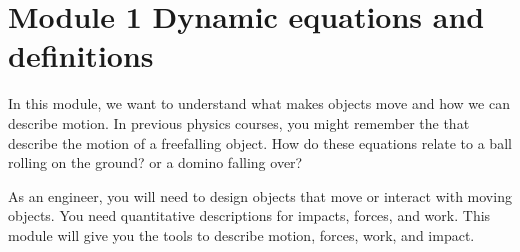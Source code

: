 \documentclass[letterpaper,10pt,english]{sphinxmanual}
\begin{document}
\chapter{Module 1 \sphinxhyphen{} Dynamic equations and definitions}
\label{\detokenize{module_01/overview:module-1-dynamic-equations-and-definitions}}\label{\detokenize{module_01/overview::doc}}

In this module, we want to understand what makes objects move and how we
can describe motion. In previous physics courses, you might remember the
that describe the motion of a free\sphinxhyphen{}falling object.  How do these
equations relate to a ball rolling on the ground? or a domino falling
over?

As an engineer, you will need to design objects that move or interact
with moving objects. You need quantitative descriptions for impacts,
forces, and work. This module will give you the tools to describe motion,
forces, work, and impact.
\end{document}
